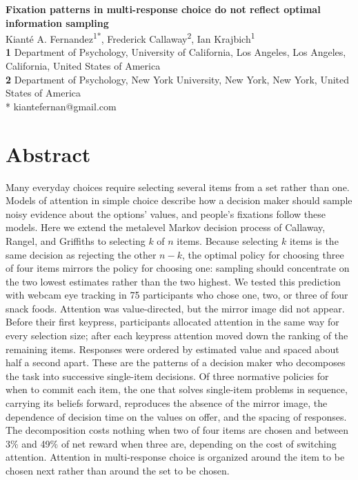 \documentclass[10pt,letterpaper]{article}
\begin{document}
\vspace*{0.2in}
\begin{flushleft}
{\Large
\textbf{Fixation patterns in multi-response choice do not reflect
optimal information sampling}
}
\newline
\\
Kianté A. Fernandez\textsuperscript{1*},
Frederick Callaway\textsuperscript{2},
Ian Krajbich\textsuperscript{1}
\\
\bigskip
\textbf{1} Department of Psychology, University of California, Los Angeles, Los Angeles, California, United States of America
\\
\textbf{2} Department of Psychology, New York University, New York, New York, United States of America
\\
\bigskip
* kiantefernan@gmail.com
\end{flushleft}
\section*{Abstract}\label{abstract}

Many everyday choices require selecting several items from a set rather
than one. Models of attention in simple choice describe how a decision
maker should sample noisy evidence about the options' values, and
people's fixations follow these models. Here we extend the metalevel
Markov decision process of Callaway, Rangel, and Griffiths to selecting
\(k\) of \(n\) items. Because selecting \(k\) items is the same decision
as rejecting the other \(n-k\), the optimal policy for choosing three of
four items mirrors the policy for choosing one: sampling should
concentrate on the two lowest estimates rather than the two highest. We
tested this prediction with webcam eye tracking in 75 participants who
chose one, two, or three of four snack foods. Attention was
value-directed, but the mirror image did not appear. Before their first
keypress, participants allocated attention in the same way for every
selection size; after each keypress attention moved down the ranking of
the remaining items. Responses were ordered by estimated value and
spaced about half a second apart. These are the patterns of a decision
maker who decomposes the task into successive single-item decisions. Of
three normative policies for when to commit each item, the one that
solves single-item problems in sequence, carrying its beliefs forward,
reproduces the absence of the mirror image, the dependence of decision
time on the values on offer, and the spacing of responses. The
decomposition costs nothing when two of four items are chosen and
between 3\% and 49\% of net reward when three are, depending on the cost
of switching attention. Attention in multi-response choice is organized
around the item to be chosen next rather than around the set to be
chosen.
\end{document}
